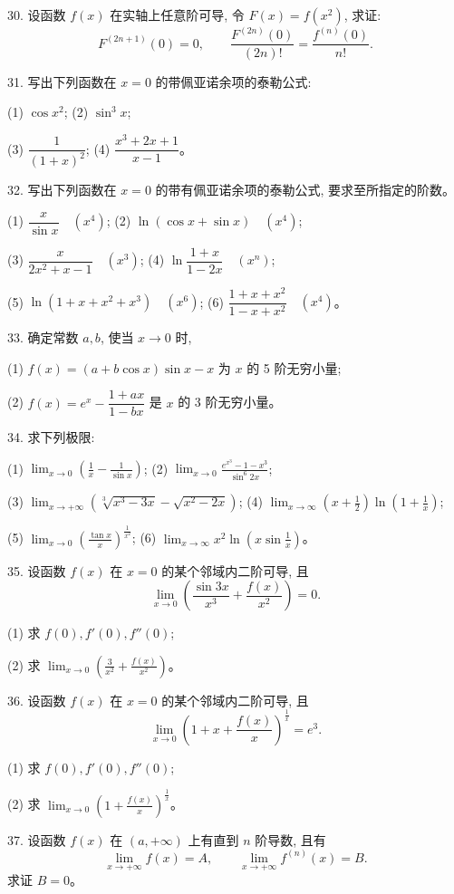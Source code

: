 \documentclass[UTF8, 12pt, fontset=fandol, oneside]{ctexart}
\begin{document}
30. 设函数 $f(x)$ 在实轴上任意阶可导, 令 $F(x)=f(x^2)$, 求证:
\[
  F^{(2n+1)}(0)=0,\qquad
  \frac{F^{(2n)}(0)}{(2n)!}=\frac{f^{(n)}(0)}{n!}.
\]

31. 写出下列函数在 $x=0$ 的带佩亚诺余项的泰勒公式:

(1) $\cos x^2$;\qquad
(2) $\sin^3x$;

(3) $\dfrac1{(1+x)^2}$;\qquad
(4) $\dfrac{x^3+2x+1}{x-1}$。

32. 写出下列函数在 $x=0$ 的带有佩亚诺余项的泰勒公式, 要求至所指定的阶数。

(1) $\dfrac{x}{\sin x}\quad (x^4)$;\qquad
(2) $\ln(\cos x+\sin x)\quad (x^4)$;

(3) $\dfrac{x}{2x^2+x-1}\quad (x^3)$;\qquad
(4) $\ln\dfrac{1+x}{1-2x}\quad (x^n)$;

(5) $\ln(1+x+x^2+x^3)\quad (x^6)$;\qquad
(6) $\dfrac{1+x+x^2}{1-x+x^2}\quad (x^4)$。

33. 确定常数 $a,b$, 使当 $x\to0$ 时,

(1) $f(x)=(a+b\cos x)\sin x-x$ 为 $x$ 的 5 阶无穷小量;

(2) $f(x)=e^x-\dfrac{1+ax}{1-bx}$ 是 $x$ 的 3 阶无穷小量。

34. 求下列极限:

(1) $\displaystyle\lim_{x\to0}\left(\frac1x-\frac1{\sin x}\right)$;\qquad
(2) $\displaystyle\lim_{x\to0}\frac{e^{x^3}-1-x^3}{\sin^6 2x}$;

(3) $\displaystyle\lim_{x\to+\infty}\left(\sqrt[3]{x^3-3x}-\sqrt{x^2-2x}\right)$;\qquad
(4) $\displaystyle\lim_{x\to\infty}\left(x+\frac12\right)\ln\left(1+\frac1x\right)$;

(5) $\displaystyle\lim_{x\to0}\left(\frac{\tan x}{x}\right)^{\frac1{x^2}}$;\qquad
(6) $\displaystyle\lim_{x\to\infty}x^2\ln\left(x\sin\frac1x\right)$。

35. 设函数 $f(x)$ 在 $x=0$ 的某个邻域内二阶可导, 且
\[
  \lim_{x\to0}\left(\frac{\sin3x}{x^3}+\frac{f(x)}{x^2}\right)=0.
\]

(1) 求 $f(0),f'(0),f''(0)$;

(2) 求 $\displaystyle\lim_{x\to0}\left(\frac3{x^2}+\frac{f(x)}{x^2}\right)$。

36. 设函数 $f(x)$ 在 $x=0$ 的某个邻域内二阶可导, 且
\[
  \lim_{x\to0}\left(1+x+\frac{f(x)}x\right)^{\frac1x}=e^3.
\]

(1) 求 $f(0),f'(0),f''(0)$;

(2) 求 $\displaystyle\lim_{x\to0}\left(1+\frac{f(x)}x\right)^{\frac1x}$。

37. 设函数 $f(x)$ 在 $(a,+\infty)$ 上有直到 $n$ 阶导数, 且有
\[
  \lim_{x\to+\infty}f(x)=A,\qquad
  \lim_{x\to+\infty}f^{(n)}(x)=B.
\]
求证 $B=0$。
\end{document}
